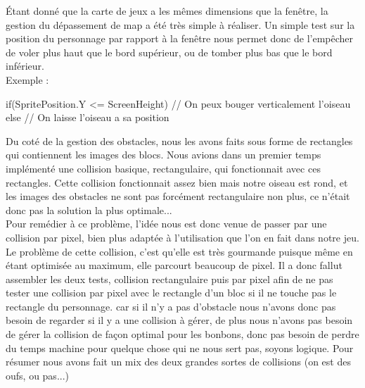 \documentclass [11pt]{report}
\begin{document}
		\indent Étant donné que la carte de jeux a les mêmes dimensions que la fenêtre, la gestion du dépassement de map a été très simple à réaliser. Un simple test sur la position du personnage par rapport à la fenêtre nous permet donc de l'empêcher de voler plus haut que le bord supérieur, ou de tomber plus bas que le bord inférieur. \\


	\newpage
		\noindent Exemple :
		
		\begin{mylisting}
		
if(SpritePosition.Y <= ScreenHeight)
{
	// On peux bouger verticalement l'oiseau
}
else
{
	// On laisse l'oiseau a sa position
}
		\end{mylisting}
	\vspace{10mm}
		
				
		\indent Du coté de la gestion des obstacles, nous les avons faits sous forme de rectangles qui contiennent les images des blocs. Nous avions dans un premier temps implémenté une collision basique, rectangulaire, qui fonctionnait avec ces rectangles. Cette collision fonctionnait assez bien mais notre oiseau est rond, et les images des obstacles ne sont pas forcément rectangulaire non plus, ce n'était donc pas la solution la plus optimale... \\
		\indent Pour remédier à ce problème, l'idée nous est donc venue de passer par une collision par pixel, bien plus adaptée à l'utilisation que l'on en fait dans notre jeu. Le problème de cette collision, c'est qu'elle est très gourmande puisque même en étant optimisée au maximum, elle parcourt beaucoup de pixel. Il a donc fallut assembler les deux tests, collision rectangulaire puis par pixel afin de ne pas tester une collision par pixel avec le rectangle d'un bloc si il ne touche pas le rectangle du personnage. car si il n'y a pas d'obstacle nous n'avons donc pas besoin de regarder si il y a une collision à gérer, de plus nous n'avons pas besoin de gérer la collision de façon optimal pour les bonbons, donc pas besoin de perdre du temps machine pour quelque chose qui ne nous sert pas, soyons logique. Pour résumer nous avons fait un mix des deux grandes sortes de collisions (on est des oufs, ou pas...)
		
		\newpage
	
\end{document}
